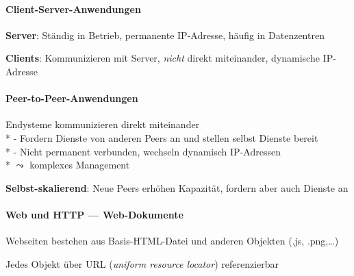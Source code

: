 \paragraph{Client-Server-Anwendungen}
\begin{items}
  \item \textbf{Server}: Ständig in Betrieb, permanente IP-Adresse, häufig in Datenzentren
  \item \textbf{Clients}: Kommunizieren mit Server, \emph{nicht} direkt miteinander, dynamische IP-Adresse
\end{items}

\paragraph{Peer-to-Peer-Anwendungen}
\begin{items}
  \item Endysteme kommunizieren direkt miteinander \\*
    - Fordern Dienste von anderen Peers an und stellen selbst Dienste bereit \\*
    - Nicht permanent verbunden, wechseln dynamisch IP-Adressen \\*
    \phantom{-} \( \leadsto \) komplexes Management
  \item \textbf{Selbst-skalierend}: Neue Peers erhöhen Kapazität, fordern aber auch Dienste an
\end{items}

\paragraph{Web und HTTP --- Web-Dokumente}
\begin{items}
  \item Webseiten bestehen aus Basis-HTML-Datei und anderen Objekten (.js, .png,\dots)
  \item Jedes Objekt über URL (\emph{uniform resource locator}) referenzierbar
\end{items}

